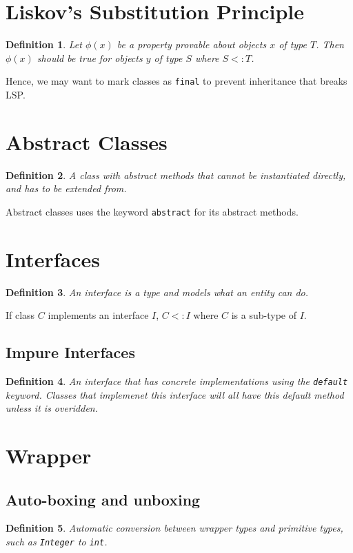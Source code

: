 \documentclass[10pt,landscape,a4paper]{article}
\newtheorem{definition}{Definition}[section]
\begin{document}
\footnotesize
\begin{multicols*}{4}

\section{Liskov's Substitution Principle}
\begin{definition}
    Let $\phi(x)$ be a property provable about objects $x$ of type $T$. Then $\phi(x)$ should be true for objects $y$ of type $S$ where $S<:T$.
\end{definition}
Hence, we may want to mark classes as \texttt{final} to prevent inheritance that breaks LSP.

\section{Abstract Classes}
\begin{definition}
    A class with abstract methods that cannot be instantiated directly, and has to be extended from.
\end{definition}
Abstract classes uses the keyword \texttt{abstract} for its abstract methods.

\section{Interfaces}
\begin{definition}
    An interface is a type and models what an entity can do.
\end{definition}
If class $C$ implements an interface $I$, $C<:I$ where $C$ is a sub-type of $I$.

\subsection{Impure Interfaces}
\begin{definition}
    An interface that has concrete implementations using the \texttt{default} keyword. Classes that implemenet this interface will all have this default method unless it is overidden.
\end{definition}


\section{Wrapper}
\subsection{Auto-boxing and unboxing}
\begin{definition}
    Automatic conversion between wrapper types and primitive types, such as \texttt{Integer} to \texttt{int}.
\end{definition}


\end{multicols*}
\end{document}
